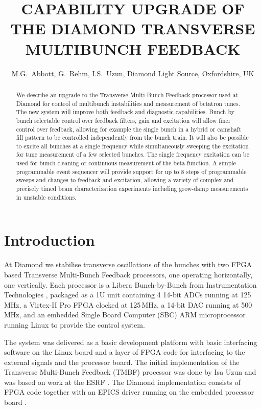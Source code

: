 \documentclass{JAC2003}
\begin{document}
\title{CAPABILITY UPGRADE OF THE DIAMOND TRANSVERSE MULTIBUNCH FEEDBACK}

\author{%
    M.G.~Abbott, G.~Rehm, I.S.~Uzun,
    Diamond Light Source, Oxfordshire, UK}

\maketitle

\begin{abstract}

We describe an upgrade to the Transverse Multi-Bunch Feedback processor used
at Diamond for control of multibunch instabilities and measurement of betatron
tunes.  The new system will improve both feedback and diagnostic capabilities.
Bunch by bunch selectable control over feedback filters, gain and excitation
will allow finer control over feedback, allowing for example the single bunch
in a hybrid or camshaft fill pattern to be controlled independently from the
bunch train.  It will also be possible to excite all bunches at a single
frequency while simultaneously sweeping the excitation for tune measurement of
a few selected bunches.  The single frequency excitation can be used for bunch
cleaning or continuous measurement of the beta-function.  A simple
programmable event sequencer will provide support for up to 8 steps of
programmable sweeps and changes to feedback and excitation, allowing a variety
of complex and precisely timed beam characterisation experiments including
grow-damp measurements in unstable conditions.

\end{abstract}


\section{Introduction}

At Diamond we stabilise transverse oscillations of the bunches with two FPGA
based Transverse Multi-Bunch Feedback processors, one operating horizontally,
one vertically.  Each processor is a Libera Bunch-by-Bunch from Instrumentation
Technologies \cite{libera}, packaged as a 1U unit containing 4 14-bit ADCs
running at 125\,MHz, a Virtex-II Pro FPGA clocked at 125\,MHz, a 14-bit DAC
running at 500\,MHz, and an embedded Single Board Computer (SBC) ARM
microprocessor running Linux to provide the control system.

The system was delivered as a basic development platform with basic interfacing
software on the Linux board and a layer of FPGA code for interfacing to the
external signals and the processor board.  The initial implementation of the
Transverse Multi-Bunch Feedback (TMBF) processor was done by Isa Uzun and was
based on work at the ESRF \cite{esrf}.  The Diamond implementation consists of
FPGA code together with an EPICS driver running on the embedded processor board
\cite{early-tmbf}.
\end{document}
